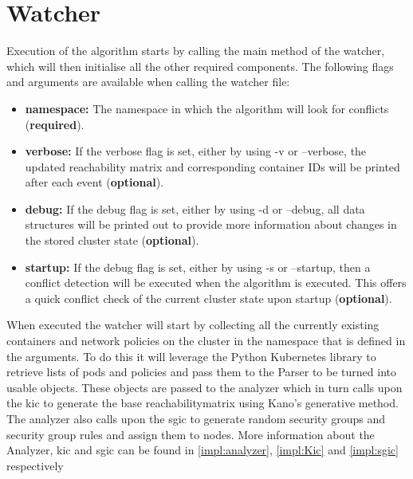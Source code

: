 \section{Watcher} \label{impl:watcher} Execution of the algorithm starts by calling the main method of the watcher, which will then initialise all the other required components. The following flags and arguments are available when calling the watcher file:
\begin{itemize}
    \renewcommand{\labelitemi}{\scriptsize$\blacksquare$}
    \item \textbf{namespace:} The namespace in which the algorithm will look for conflicts (\textbf{required}).
    \item \textbf{verbose:} If the verbose flag is set, either by using -v or --verbose, the updated reachability matrix and corresponding container IDs will be printed after each event (\textbf{optional}). 
    \item \textbf{debug:} If the debug flag is set, either by using -d or --debug, all data structures will be printed out to provide more information about changes in the stored cluster state (\textbf{optional}).
    \item \textbf{startup:} If the debug flag is set, either by using -s or --startup, then a conflict detection will be executed when the algorithm is executed. This offers a quick conflict check of the current cluster state upon startup (\textbf{optional}).
\end{itemize}
When executed the watcher will start by collecting all the currently existing containers and network policies on the cluster in the namespace that is defined in the arguments. To do this it will leverage the Python Kubernetes library to retrieve lists of pods and policies and pass them to the Parser to be turned into usable objects. These objects are passed to the analyzer which in turn calls upon the \acrlong{kic} to generate the base reachabilitymatrix using Kano's generative method. The analyzer also calls upon the \acrlong{sgic} to generate random security groups and security group rules and assign them to nodes. More information about the Analyzer, \acrshort{kic} and \acrshort{sgic} can be found in \autoref{impl:analyzer}, \autoref{impl:Kic} and \autoref{impl:sgic} respectively
\\[10pt]

